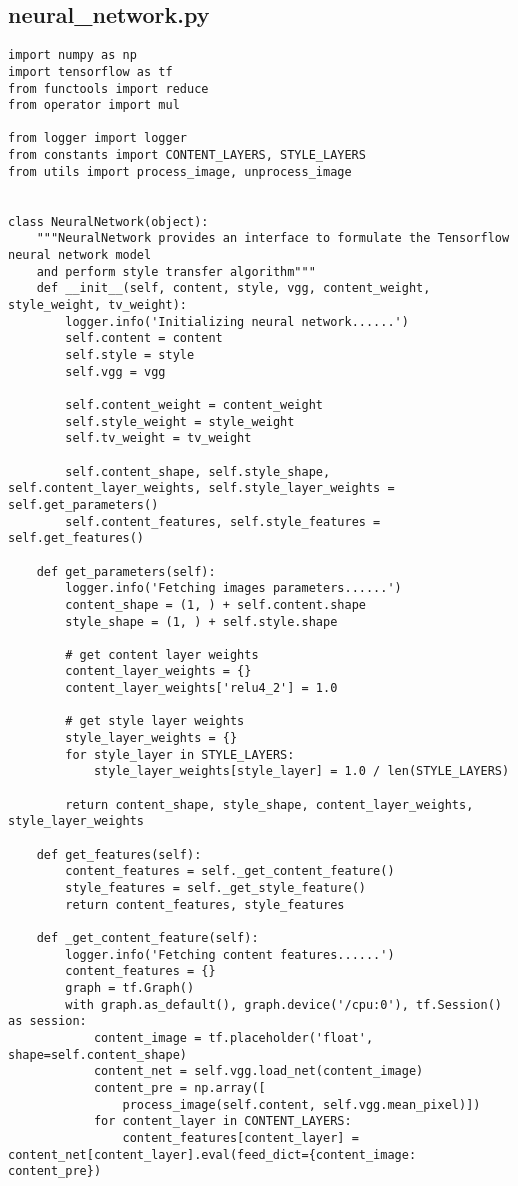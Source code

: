 \newpage
\begin{spacing}{1}
\section{neural\_network.py}
\label{sec:code:nn}
\begin{lstlisting}
import numpy as np
import tensorflow as tf
from functools import reduce
from operator import mul

from logger import logger
from constants import CONTENT_LAYERS, STYLE_LAYERS
from utils import process_image, unprocess_image


class NeuralNetwork(object):
    """NeuralNetwork provides an interface to formulate the Tensorflow neural network model
    and perform style transfer algorithm"""
    def __init__(self, content, style, vgg, content_weight, style_weight, tv_weight):
        logger.info('Initializing neural network......')
        self.content = content
        self.style = style
        self.vgg = vgg

        self.content_weight = content_weight
        self.style_weight = style_weight
        self.tv_weight = tv_weight

        self.content_shape, self.style_shape, self.content_layer_weights, self.style_layer_weights = self.get_parameters()
        self.content_features, self.style_features = self.get_features()

    def get_parameters(self):
        logger.info('Fetching images parameters......')
        content_shape = (1, ) + self.content.shape
        style_shape = (1, ) + self.style.shape

        # get content layer weights
        content_layer_weights = {}
        content_layer_weights['relu4_2'] = 1.0

        # get style layer weights
        style_layer_weights = {}
        for style_layer in STYLE_LAYERS:
            style_layer_weights[style_layer] = 1.0 / len(STYLE_LAYERS)

        return content_shape, style_shape, content_layer_weights, style_layer_weights

    def get_features(self):
        content_features = self._get_content_feature()
        style_features = self._get_style_feature()
        return content_features, style_features

    def _get_content_feature(self):
        logger.info('Fetching content features......')
        content_features = {}
        graph = tf.Graph()
        with graph.as_default(), graph.device('/cpu:0'), tf.Session() as session:
            content_image = tf.placeholder('float', shape=self.content_shape)
            content_net = self.vgg.load_net(content_image)
            content_pre = np.array([
                process_image(self.content, self.vgg.mean_pixel)])
            for content_layer in CONTENT_LAYERS:
                content_features[content_layer] = content_net[content_layer].eval(feed_dict={content_image: content_pre})


\end{lstlisting}
\end{spacing}
